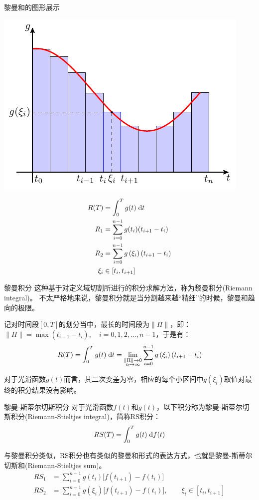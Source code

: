 \documentclass[t]{beamer}
\newcommand{\dif}{{\;\rm d}}
\begin{document}
\begin{frame}{黎曼和的图形展示}
\begin{multicols}{2}
	\centering\includegraphics[scale=0.95]{fig/riemann-sum.pdf}

\[\begin{split}
R(T)&=\int^T_0 g(t)\dif t \\
R_1&= \sum^{n-1}_{i=0}g(t_{i})(t_{i+1}-t_{i})\\
R_2&= \sum^{n-1}_{i=0}g\left(\xi_i\right)(t_{i+1}-t_{i})\\
\xi_i&\in[t_i,t_{i+1}]
\end{split}\]
\end{multicols}
\end{frame}

\begin{frame}{黎曼积分}
这种基于对定义域切割所进行的积分求解方法，称为黎曼积分(Riemann integral)。
不太严格地来说，黎曼积分就是当分割越来越“精细”的时候，黎曼和趋向的极限。

记对时间段$[0,T]$的划分当中，最长的时间段为$\|\Pi\|$，即：
$\|\Pi\|=\max(t_{i+1}-t_{i}),\quad i=0,1,2,\ldots,n-1 $，于是有：
\[R(T)=\int^T_0 g(t)\dif t=\lim_{\substack{\|\Pi\|\to 0 \\ n\to\infty}}\sum^{n-1}_{i=0}g\left(\xi_i\right)(t_{i+1}-t_{i}) \]

对于光滑函数$g(t)$而言，其二次变差为零，相应的每个小区间中$g(\xi_i)$取值对最终的积分结果没有影响。
\end{frame}


\begin{frame}{黎曼-斯蒂尔切斯积分}
对于光滑函数$f(t)$和$g(t)$，以下积分称为黎曼-斯蒂尔切斯积分(Riemann-Stieltjes integral)，简称RS积分：
\begin{equation*}
RS(T)=\int^T_0 g(t)\dif f(t) 
\end{equation*}

与黎曼积分类似，RS积分也有类似的黎曼和形式的表达方式，也就是黎曼-斯蒂尔切斯和(Riemann-Stieltjes sum)。
\begin{equation*}
\begin{split}
RS_1&= \sum^{n-1}_{i=0}g(t_{i})\big[f(t_{i+1})-f(t_{i})\big]\\
RS_2&= \sum^{n-1}_{i=0}g(\xi_i)\big[f(t_{i+1})-f(t_{i})\big],\qquad  \xi_i\in[t_i,t_{i+1}]
\end{split}
\end{equation*}
\end{frame}
\end{document}
